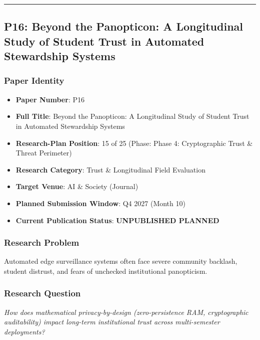 \documentclass[11pt,letterpaper]{article}
\begin{document}
\vspace{0.4cm}
\hrule

\subsection{P16: Beyond the Panopticon: A Longitudinal Study of Student Trust in Automated Stewardship Systems}
\label{sec:profile_p16}

\subsubsection{Paper Identity}
\begin{itemize}[leftmargin=*]
    \item \textbf{Paper Number}: P16
    \item \textbf{Full Title}: Beyond the Panopticon: A Longitudinal Study of Student Trust in Automated Stewardship Systems
    \item \textbf{Research-Plan Position}: 15 of 25 (Phase: Phase 4: Cryptographic Trust \& Threat Perimeter)
    \item \textbf{Research Category}: Trust \& Longitudinal Field Evaluation
    \item \textbf{Target Venue}: AI \& Society (Journal)
    \item \textbf{Planned Submission Window}: Q4 2027 (Month 10)
    \item \textbf{Current Publication Status}: \textbf{UNPUBLISHED PLANNED}
\end{itemize}

\subsubsection{Research Problem}
Automated edge surveillance systems often face severe community backlash, student distrust, and fears of unchecked institutional panopticism.

\subsubsection{Research Question}
\begin{tcolorbox}[colback=blue!3!white,colframe=blue!50!black,title=Primary Scientific Question]
\textit{How does mathematical privacy-\allowbreak by-\allowbreak design (zero-\allowbreak persistence RAM, cryptographic auditability) impact long-\allowbreak term institutional trust across multi-\allowbreak semester deployments?}
\end{tcolorbox}
\end{document}

